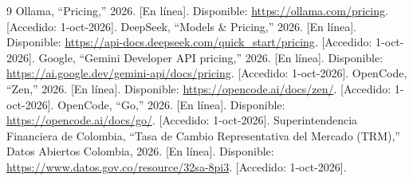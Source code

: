 \documentclass[letterpaper,11pt]{article}
\begin{document}
\begin{thebibliography}{9}
 Ollama, ``Pricing,'' 2026. [En línea]. Disponible: \url{https://ollama.com/pricing}. [Accedido: 1-oct-2026].
 DeepSeek, ``Models \& Pricing,'' 2026. [En línea]. Disponible: \url{https://api-docs.deepseek.com/quick_start/pricing}. [Accedido: 1-oct-2026].
 Google, ``Gemini Developer API pricing,'' 2026. [En línea]. Disponible: \url{https://ai.google.dev/gemini-api/docs/pricing}. [Accedido: 1-oct-2026].
 OpenCode, ``Zen,'' 2026. [En línea]. Disponible: \url{https://opencode.ai/docs/zen/}. [Accedido: 1-oct-2026].
 OpenCode, ``Go,'' 2026. [En línea]. Disponible: \url{https://opencode.ai/docs/go/}. [Accedido: 1-oct-2026].
 Superintendencia Financiera de Colombia, ``Tasa de Cambio Representativa del Mercado (TRM),'' Datos Abiertos Colombia, 2026. [En línea]. Disponible: \url{https://www.datos.gov.co/resource/32sa-8pi3}. [Accedido: 1-oct-2026].
\end{thebibliography}
\end{document}
